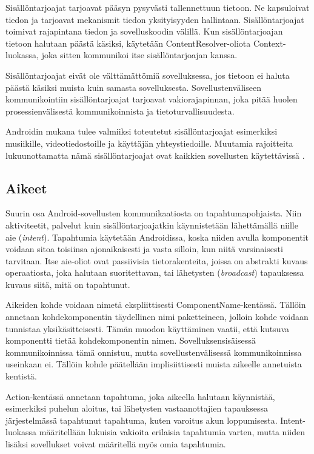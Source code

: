 Sisällöntarjoajat tarjoavat pääsyn pysyvästi tallennettuun tietoon. Ne kapsuloivat tiedon ja tarjoavat mekanismit tiedon yksityisyyden hallintaan. Sisällöntarjoajat toimivat rajapintana tiedon ja sovelluskoodin välillä. Kun sisällöntarjoajan tietoon halutaan päästä käsiksi, käytetään ContentResolver-oliota Context-luokassa, joka sitten kommunikoi itse sisällöntarjoajan kanssa.

Sisällöntarjoajat eivät ole välttämättömiä sovelluksessa, jos tietoon ei haluta päästä käsiksi muista kuin samasta sovelluksesta. Sovellustenväliseen kommunikointiin sisällöntarjoajat tarjoavat vakiorajapinnan, joka pitää huolen prosessienvälisestä kommunikoinnista ja tietoturvallisuudesta.

Androidin mukana tulee valmiiksi toteutetut sisällöntarjoajat esimerkiksi musiikille, videotiedostoille ja käyttäjän yhteystiedoille. Muutamia rajoitteita lukuunottamatta nämä sisällöntarjoajat ovat kaikkien sovellusten käytettävissä \cite{android}.

\subsection{Aikeet}
\label{intents}

Suurin osa Android-sovellusten kommunikaatiosta on tapahtumapohjaista. Niin aktiviteetit, palvelut kuin sisällöntarjoajatkin käynnistetään lähettämällä niille aie (\emph{intent}). Tapahtumia käytetään Androidissa, koska niiden avulla komponentit voidaan sitoa toisiinsa ajonaikaisesti ja vasta silloin, kun niitä varsinaisesti tarvitaan. Itse aie-oliot ovat passiivisia tietorakenteita, joissa on abstrakti kuvaus operaatiosta, joka halutaan suoritettavan, tai lähetysten (\emph{broadcast}) tapauksessa kuvaus siitä, mitä on tapahtunut. 

Aikeiden kohde voidaan nimetä ekspliittisesti ComponentName-kentässä. Tällöin annetaan kohdekomponentin täydellinen nimi paketteineen, jolloin kohde voidaan tunnistaa yksikäsitteisesti. Tämän muodon käyttäminen vaatii, että kutsuva komponentti tietää kohdekomponentin nimen. Sovelluksensisäisessä kommunikoinnissa tämä onnistuu, mutta sovellustenvälisessä kommunikoinnissa useinkaan ei. Tällöin kohde päätellään implisiittisesti muista aikeelle annetuista kentistä.

Action-kentässä annetaan tapahtuma, joka aikeella halutaan käynnistää, esimerkiksi puhelun aloitus, tai lähetysten vastaanottajien tapauksessa järjestelmässä tapahtunut tapahtuma, kuten varoitus akun loppumisesta. Intent-luokassa määritellään lukuisia vakioita erilaisia tapahtumia varten, mutta niiden lisäksi sovellukset voivat määritellä myös omia tapahtumia.

